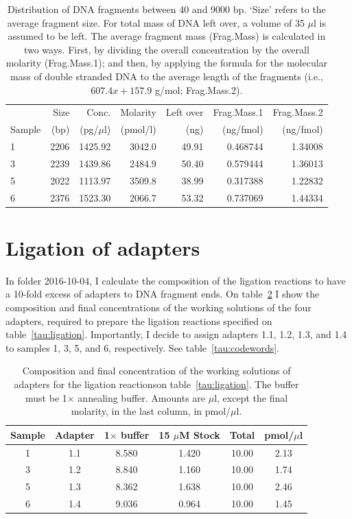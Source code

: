 \documentclass[a4paper,12pt]{article}
\begin{document}
\begin{table}
\begin{center}
\caption{Distribution of DNA fragments between 40 and 9000 bp. `Size' refers to the average fragment size. For total mass of DNA left over, a volume of 35 $\mu$l is assumed to be left. The average fragment mass (Frag.Mass) is calculated in two ways. First, by dividing the overall concentration by the overall molarity (Frag.Mass.1); and then, by applying the formula for the molecular mass of double stranded DNA to the average length of the fragments (i.e., $607.4x+157.9$ g/mol; Frag.Mass.2).}\label{tau:fragments}
\vspace*{0.3cm}
\begin{tabular}{lrrrrrr}
\toprule
&Size&Conc.&Molarity&Left over&Frag.Mass.1&Frag.Mass.2\\
Sample&(bp)&(pg/$\mu$l)&(pmol/l)&(ng)&(ng/fmol)&(ng/fmol)\\
\midrule
1&2206&1425.92&3042.0&49.91&0.468744&1.34008\\
3&2239&1439.86&2484.9&50.40&0.579444&1.36013\\
5&2022&1113.97&3509.8&38.99&0.317388&1.22832\\
6&2376&1523.30&2066.7&53.32&0.737069&1.44334\\
\bottomrule
\end{tabular}
\end{center}
\end{table}

\section{Ligation of adapters}
In folder 2016-10-04, I calculate the composition of the ligation reactions to have a 10-fold excess of adapters to DNA fragment ends. On table~\ref{tau:working} I show the composition and final concentrations of the working solutions of the four adapters, required to prepare the ligation reactions specified on table~\ref{tau:ligation}. Importantly, I decide to assign adapters 1.1, 1.2, 1.3, and 1.4 to samples 1, 3, 5, and 6, respectively. See table~\ref{tau:codewords}. 

\begin{table}
\begin{center}
\caption{Composition and final concentration of the working solutions of adapters for the ligation reactionson table~\ref{tau:ligation}. The buffer must be 1$\times$ annealing buffer. Amounts are $\mu$l, except the final molarity, in the last column, in pmol/$\mu$l.}\label{tau:working}
\vspace*{0.2cm}
\begin{tabular}{cccccc}
\toprule
Sample&Adapter&1$\times$ buffer&15 $\mu$M Stock&Total&pmol/$\mu$l\\
\midrule
1&1.1&8.580&1.420&10.00&2.13\\
3&1.2&8.840&1.160&10.00&1.74\\
5&1.3&8.362&1.638&10.00&2.46\\
6&1.4&9.036&0.964&10.00&1.45\\
\bottomrule
\end{tabular}
\end{center}
\end{table}
\end{document}
